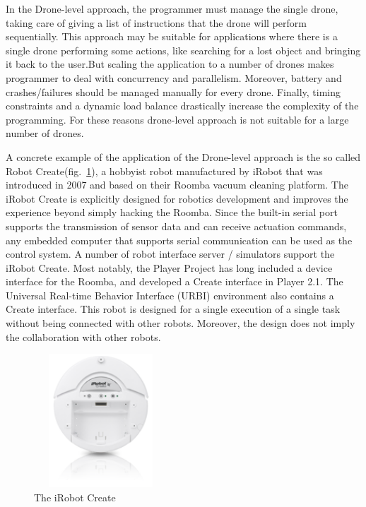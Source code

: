 In the Drone-level approach, the programmer must manage the single drone, taking care of giving a list of instructions that the drone will perform sequentially.
This approach may be suitable for applications where there is a single drone performing some actions, like searching for a lost object and bringing it back to the user.But scaling the application to a number of drones makes programmer to deal with  concurrency and parallelism. Moreover, battery and crashes/failures should be managed manually for every drone. Finally, timing constraints and a dynamic load balance drastically increase the complexity of the programming. For these reasons drone-level approach is not suitable for a large number of drones.

A concrete example of the application of the Drone-level approach is the so called Robot Create(fig.~\ref{fig:irobot}), a hobbyist robot manufactured by iRobot that was introduced in 2007 and based on their Roomba vacuum cleaning platform. The iRobot Create is explicitly designed for robotics development and improves the experience beyond simply hacking the Roomba. 
Since the built-in serial port supports the transmission of sensor data and can receive actuation commands, any embedded computer that supports serial communication can be used as the control system.
A number of robot interface server / simulators support the iRobot Create. Most notably, the Player Project has long included a device interface for the Roomba, and developed a Create interface in Player 2.1. The Universal Real-time Behavior Interface (URBI) environment also contains a Create interface.
This robot is designed for a single execution of a single task without being connected with other robots. Moreover, the design does not imply the collaboration with other robots.

\begin{figure}[H]
  \centering
  \includegraphics[width=5cm,height=5cm]{pictures/Irobot.png}
  \caption{The iRobot Create}
  \label{fig:irobot}
\end{figure}

